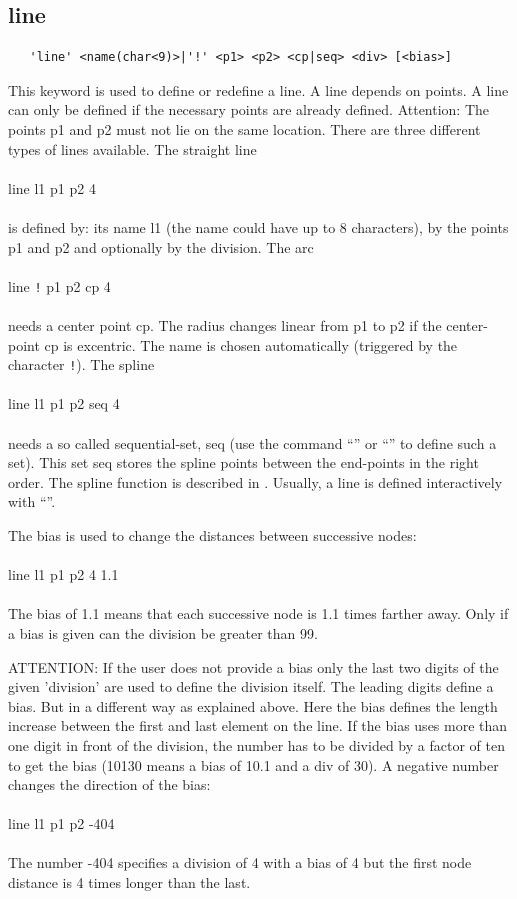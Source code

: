 \documentclass{article}
\begin{document}
\subsection{\label{line}line}
\begin{verbatim}
   'line' <name(char<9)>|'!' <p1> <p2> <cp|seq> <div> [<bias>] 
\end{verbatim}
This keyword is used to define or redefine a line. A line depends on points. A line can only be defined if the necessary points are already defined. Attention: The points p1 and p2 must not lie on the same location. There are three different types of lines available. The straight line\\\\
line l1 p1 p2 4\\\\
is defined by: its name l1 (the name could have up to 8 characters), by the points p1 and p2 and optionally by the division. The arc\\\\
line \verb_!_ p1 p2 cp 4\\\\
needs a center point cp. The radius changes linear from p1 to p2 if the center-point cp is excentric. The name is chosen automatically (triggered by the character \verb_!_). The spline\\\\
line l1 p1 p2 seq 4\\\\
needs a so called sequential-set, seq (use the command ``'' or ``'' to define such a set). This set seq stores the spline points between the end-points in the right order. The spline function is described in \cite{spline}. Usually, a line is defined interactively with ``''.

The bias is used to change the distances between successive nodes:\\\\
line l1 p1 p2 4 1.1\\\\
The bias of 1.1 means that each successive node is 1.1 times farther away. Only if a bias is given can the division be greater than 99.

ATTENTION: If the user does not provide a bias only the last two digits of the given 'division' are used to define the division itself. The leading digits define a bias. But in a different way as explained above. Here the bias defines the length increase between the first and last element on the line. If the bias uses more than one digit in front of the division, the number has to be divided by a factor of ten to get the bias (10130 means a bias of 10.1 and a div of 30). A negative number changes the direction of the bias:\\\\
line l1 p1 p2 -404\\\\The number -404 specifies a division of 4 with a bias of 4 but the first node distance is 4 times longer than the last.
 
\end{document}
